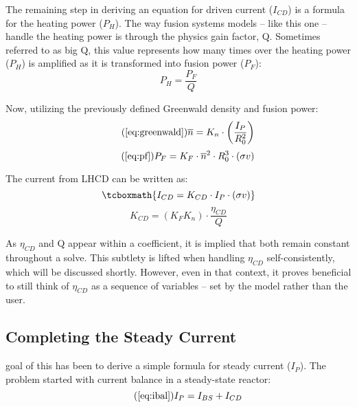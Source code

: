 The remaining step in deriving an equation for driven current ($I_{CD}$) is a formula for the heating power ($P_H$). The way fusion systems models -- like this one -- handle the heating power is through the physics gain factor, Q. Sometimes referred to as big Q, this value represents how many times over the heating power ($P_H$) is amplified as it is transformed into fusion power ($P_F$):
\begin{equation}
	P_H = \frac{P_F}{Q}
\end{equation}

Now, utilizing the previously defined Greenwald density and fusion power:
 \begin{equation}
 	\tag{\ref{eq:greenwald}}
 	\overline n = K_n \cdot \left( \frac{I_P}{R_0^2} \right)
 \end{equation}
 \begin{equation}
	\tag{\ref{eq:pf}}
	P_F = K_F \cdot \overline{n}^2 \cdot R_0^3  \cdot (\sigma v)
\end{equation}

The current from LHCD can be written as:
\begin{equation}
	\label{eq:icd}
	\tcboxmath{
	I_{CD} = K_{CD} \cdot I_P \cdot ( \sigma v )
	}
\end{equation}
\begin{equation}
	K_{CD} = \left( K_F K_n \right) \cdot \frac{\eta_{CD}}{Q}
\end{equation}

As $\eta_{CD}$ and Q appear within a  coefficient, it is implied that both remain constant throughout a solve. This subtlety is lifted when handling $\eta_{CD}$ self-consistently, which will be discussed shortly. However, even in that context, it proves beneficial to still think of $\eta_{CD}$ as a sequence of  variables -- set by the model rather than the user.

\subsection{Completing the Steady Current}

 goal of this  has been to derive a simple formula for steady current ($I_P$). The problem started with current balance in a steady-state reactor:
\begin{equation}
	\tag{\ref{eq:ibal}}
	I_P = I_{BS} + I_{CD}
\end{equation}

